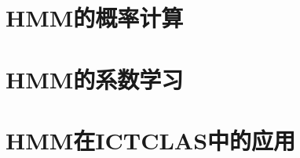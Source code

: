 \documentclass[a4paper]{ctexart}
\begin{document}
\section{HMM的概率计算}
\section{HMM的系数学习}
\section{HMM在ICTCLAS中的应用}
\end{document}
